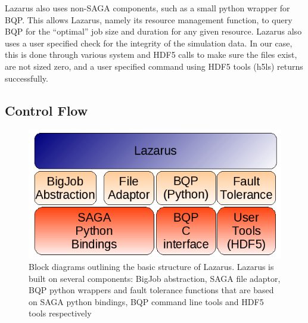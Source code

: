 \documentclass[conference,final]{IEEEtran}
\begin{document}
Lazarus also uses non-SAGA components, such as a small python wrapper
for BQP. This allows Lazarus, namely its resource management function,
to query BQP for the ``optimal'' job size and duration for any given
resource. Lazarus also uses a user specified check for the integrity
of the simulation data. In our case, this is done through various
system and HDF5 calls to make sure the files exist, are not sized
zero, and a user specified command using HDF5 tools (h5ls) returns
successfully.



\subsection{Control Flow}

\begin{figure}
\begin{center}
\includegraphics[scale=0.5]{./figures/Architecture.png}
\caption{Block diagrams outlining the basic structure of Lazarus. Lazarus is built on
several components: BigJob abstraction, SAGA file adaptor, BQP python wrappers and fault tolerance
functions that are based on SAGA python bindings, BQP command line tools and HDF5 tools respectively
}
\end{center}

\label{fig:application_architecture}
\end{figure}
\end{document}
